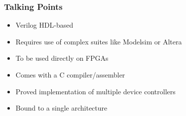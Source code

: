 \subsubsection{Talking Points}

\begin{itemize}
    \item Verilog HDL-based
    \item Requires use of complex suites like Modelsim or Altera
    \item To be used directly on FPGAs
    \item Comes with a C compiler/assembler
    \item Proved implementation of multiple device controllers
    \item Bound to a single architecture
\end{itemize}
